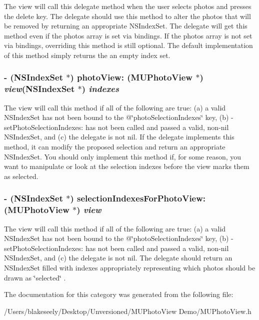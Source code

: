 The view will call this delegate method when the user selects photos and presses the delete key. The delegate should use this method to alter the photos that will be removed by returning an appropriate NSIndex\-Set. The delegate will get this method even if the photos array is set via bindings. If the photos array is not set via bindings, overriding this method is still optional. The default implementation of this method simply returns the an empty index set. 
\subsubsection{\setlength{\rightskip}{0pt plus 5cm}- (NSIndex\-Set $\ast$) photo\-View: ({\bf MUPhoto\-View} $\ast$) {\em view}(NSIndex\-Set $\ast$) {\em indexes}}\label{category_n_s_object(_m_u_photo_view_delegate)_cc75f4ee5d3ecd0c2c37c0b26f6bf08c}


The view will call this method if all of the following are true: (a) a valid NSIndex\-Set has not been bound to the @\char`\"{}photo\-Selection\-Indexes\char`\"{} key, (b) -set\-Photo\-Selection\-Indexes: has not been called and passed a valid, non-nil NSIndex\-Set, and (c) the delegate is not nil. If the delegate implements this method, it can modify the proposed selection and return an appropriate NSIndex\-Set. You should only implement this method if, for some reason, you want to manipulate or look at the selection indexes before the view marks them as selected. 
\subsubsection{\setlength{\rightskip}{0pt plus 5cm}- (NSIndex\-Set $\ast$) selection\-Indexes\-For\-Photo\-View: ({\bf MUPhoto\-View} $\ast$) {\em view}}\label{category_n_s_object(_m_u_photo_view_delegate)_aba153f99799dc20969fd3538cbc92ea}


The view will call this method if all of the following are true: (a) a valid NSIndex\-Set has not been bound to the @\char`\"{}photo\-Selection\-Indexes\char`\"{} key, (b) -set\-Photo\-Selection\-Indexes: has not been called and passed a valid, non-nil NSIndex\-Set, and (c) the delegate is not nil. The delegate should return an NSIndex\-Set filled with indexes appropriately representing which photos should be drawn as \char`\"{}selected\char`\"{} . 

The documentation for this category was generated from the following file:\begin{CompactItemize}
\item 
/Users/blakeseely/Desktop/Unversioned/MUPhoto\-View Demo/MUPhoto\-View.h\end{CompactItemize}

